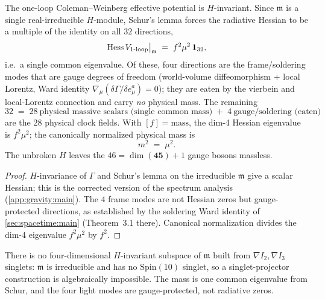\begin{theorem}
\label{thm:gravity:spectrum}
The one-loop Coleman--Weinberg effective potential is $H$-invariant.
Since $\mathfrak m$ is a single real-irreducible $H$-module, Schur's lemma
forces the radiative Hessian to be a multiple of the identity on all
$32$ directions,
\[
  \operatorname{Hess} V_{\mathrm{1\text{-}loop}}\big|_{\mathfrak m}
  \;=\; f^{2}\mu^{2}\,\mathbf 1_{32},
\]
i.e.\ a single common eigenvalue. Of these, four directions are the
frame/soldering modes that are gauge degrees of freedom (world-volume
diffeomorphism $+$ local Lorentz, Ward identity
$\nabla_{\mu}(\delta\Gamma/\delta e^{a}_{\mu})=0$); they are eaten by the
vierbein and local-Lorentz connection and carry \emph{no} physical mass.
The remaining
\[
  32 \;=\; 28\ \text{physical massive scalars (single common mass)}\;+\;4\ \text{gauge/soldering (eaten)}
\]
are the $28$ physical clock fields. With $[f]=\text{mass}$, the dim-4
Hessian eigenvalue is $f^{2}\mu^{2}$; the canonically normalized physical
mass is
\[
  m^{2} \;=\; \mu^{2}.
\]
The unbroken $H$ leaves the $46=\dim(\mathbf{45})+1$ gauge bosons massless.
\end{theorem}

\begin{proof}
$H$-invariance of $\Gamma$ and Schur's lemma on the irreducible $\mathfrak m$
give a scalar Hessian; this is the corrected version of the spectrum
analysis (\autoref{app:gravity:main}). The $4$ frame modes are not Hessian
zeros but gauge-protected directions, as established by the soldering Ward
identity of \autoref{sec:spacetime:main} (Theorem~3.1 there). Canonical
normalization divides the dim-4 eigenvalue $f^{2}\mu^{2}$ by $f^{2}$.
\end{proof}

\begin{remark}
\label{rmk:gravity:nosinglet}
There is no four-dimensional $H$-invariant subspace of $\mathfrak m$ built
from $\nabla I_{2},\nabla I_{3}$ singlets: $\mathfrak m$ is irreducible and
has no $\mathrm{Spin}(10)$ singlet, so a singlet-projector construction is
algebraically impossible. The mass is one common eigenvalue from Schur, and
the four light modes are gauge-protected, not radiative zeros.
\end{remark}


